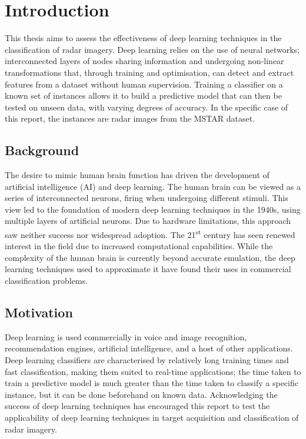 \chapter{Introduction}


This thesis aims to assess the effectiveness of deep learning techniques in the classification of radar imagery. Deep learning relies on the use of neural networks; interconnected layers of nodes sharing information and undergoing non-linear transformations that, through training and optimisation, can detect and extract features from a dataset without human supervision. Training a classifier on a known set of instances allows it to build a predictive model that can then be tested on unseen data, with varying degrees of accuracy. In the specific case of this report, the instances are radar images from the MSTAR dataset.






\section{Background}
The desire to mimic human brain function has driven the development of artificial intelligence (AI) and deep learning. The human brain can be viewed as a series of interconnected neurons, firing when undergoing different stimuli. This view led to the foundation of modern deep learning techniques in the 1940s, using multiple layers of artificial neurons. Due to hardware limitations, this approach saw neither success nor widespread adoption. The 21\textsuperscript{st} century has seen renewed interest in the field due to increased computational capabilities. While the complexity of the human brain is currently beyond accurate emulation, the deep learning techniques used to approximate it have found their uses in commercial classification problems.

\section{Motivation}

Deep learning is used commercially in voice and image recognition, recommendation engines, artificial intelligence, and a host of other applications. Deep learning classifiers are characterised by relatively long training times and fast classification, making them suited to real-time applications; the time taken to train a predictive model is much greater than the time taken to classify a specific instance, but it can be done beforehand on known data. Acknowledging the success of deep learning techniques has encouraged this report to test the applicability of deep learning techniques in target acquisition and classification of radar imagery.  


